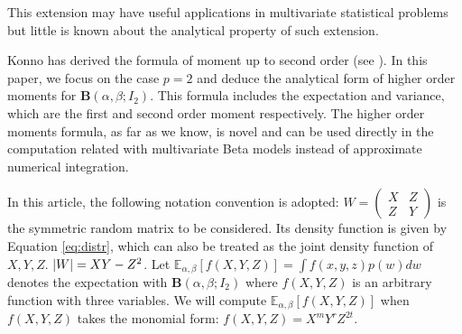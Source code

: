\documentclass[mathpazo]{cmr}
\DeclarePairedDelimiter\abs{\lvert}{\rvert}
\def\E{\mathbb{E}}
\begin{document}
This extension may have useful applications in multivariate statistical
problems but little is known about the analytical property of such extension.

Konno has derived the formula of moment up to second order (see \cite{konno_1988}).
In this paper, we focus on the case $p=2$ and deduce the analytical form of 
higher order moments for $\mathbf{B}(\alpha, \beta; I_2)$.
This formula
includes the expectation and variance, which are the first and second
order moment respectively. The higher order moments formula, as
far as we know, is novel and can be used directly in the computation
related with multivariate Beta models instead of approximate
numerical integration.

In this article, the following notation convention is adopted:
$W=\begin{pmatrix} X & Z \\ Z & Y \end{pmatrix}$ is the symmetric random
matrix to be considered. Its density function is given by Equation \eqref{eq:distr}, which can
also be treated as the joint density function of $X,Y,Z$.
$\abs{W}=XY-Z^2$.
Let $\E_{\alpha,\beta}[f(X,Y, Z)] = \int f(x,y,z)p(w)dw$ denotes the expectation
with $\mathbf{B}(\alpha, \beta;I_2)$ where $f(X, Y, Z)$ is an arbitrary function with three
variables. We will compute $\E_{\alpha,\beta}[f(X,Y, Z)]$
when $f(X,Y,Z)$ takes the monomial form: $f(X,Y,Z)=X^m Y^r Z^{2t}$.
\end{document}
